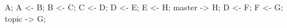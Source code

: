	\rootCommit A;
	\commit A <- B;
	\commit B <- C;
	\commit C <- D;
	\commit D <- E;
	\commit E <- H;
	\branchref master -> H;
	\downCommit D <- F;
	\commit F <- G;
	\branchref topic -> G;
\finefiguranofloattikz
